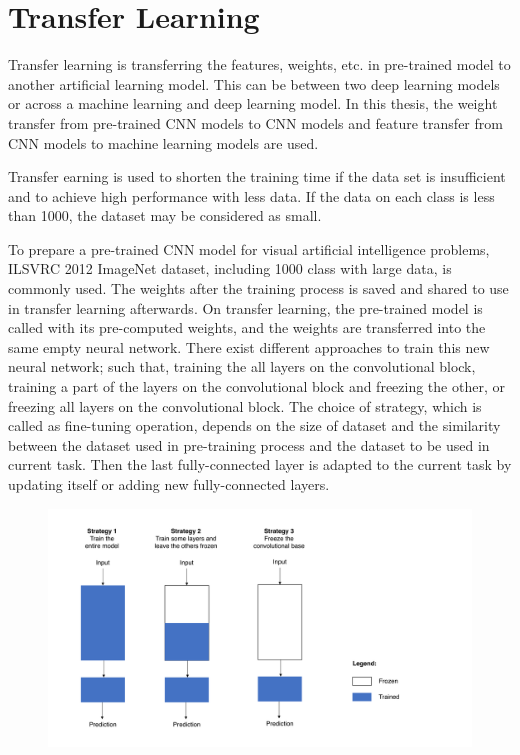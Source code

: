 \section{Transfer Learning}

Transfer learning is transferring the features, weights, etc. in pre-trained model to another artificial learning model. This can be between two deep learning models or across a machine learning and deep learning model. In this thesis, the weight transfer from pre-trained CNN models to CNN models and feature transfer from CNN models to machine learning models are used.

Transfer earning is used to shorten the training time if the data set is insufficient and to achieve high performance with less data. If the data on each class is less than 1000, the dataset may be considered as small. 

To prepare a pre-trained CNN model for visual artificial intelligence problems, ILSVRC 2012 ImageNet \cite{imagenet} dataset, including 1000 class with large data, is commonly used. The weights after the training process is saved and shared to use in transfer learning afterwards. On transfer learning, the pre-trained model is called with its pre-computed weights, and the weights are transferred into the same empty neural network. There exist different approaches to train this new neural network; such that, training the all layers on the convolutional block, training a part of the layers on the convolutional block and freezing the other, or freezing all layers on the convolutional block. The choice of strategy, which is called as fine-tuning operation, depends on the size of dataset and the similarity between the dataset used in pre-training process and the dataset to be used in current task. Then the last fully-connected layer is adapted to the current task by updating itself or adding new fully-connected layers.

\begin{figure}[h]
	\centering
	\includegraphics[width=.8\linewidth]{fig/pretrain_strategies.png}
	\vspace*{1mm}
	\label{fig:pretrain_strategies}
\end{figure}

